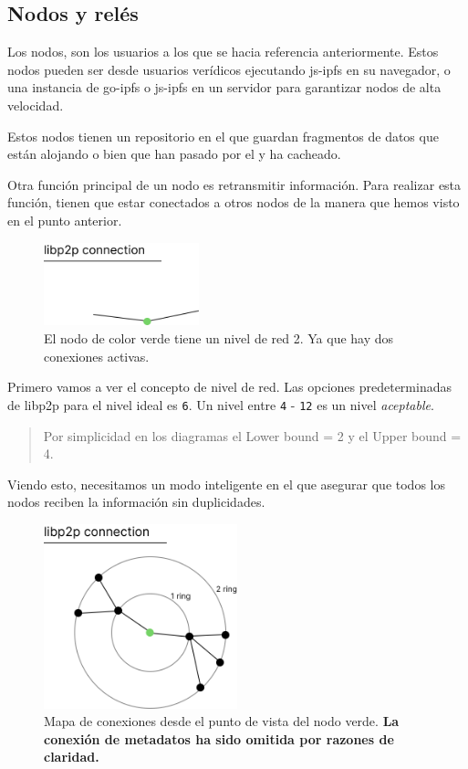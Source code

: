 \subsection{Nodos y relés}
Los nodos, son los usuarios a los que se hacia referencia anteriormente. Estos nodos pueden ser desde usuarios verídicos ejecutando js-ipfs \cite{web:js-ipfs} en su navegador, o una instancia de go-ipfs o js-ipfs \cite{web:js-ipfs} en un servidor para garantizar nodos de alta velocidad.

Estos nodos tienen un repositorio en el que guardan fragmentos de datos que están alojando o bien que han pasado por el y ha cacheado.

Otra función principal de un nodo es retransmitir información. Para realizar esta función, tienen que estar conectados a otros nodos de la manera que hemos visto en el punto anterior.
\begin{figure}[h!]
    \centering
    \includegraphics[width=0.4\textwidth]{Figures/Angulo 2.png}
    \caption{El nodo de color verde tiene un nivel de red 2. Ya que hay dos conexiones activas.}
    \label{fg:network_dgr}
\end{figure}
Primero vamos a ver el concepto de nivel de red. Las opciones predeterminadas de libp2p para el nivel ideal es \verb|6|. Un nivel entre \verb|4| - \verb|12| es un nivel \textit{aceptable}.
\begin{quote}
    Por simplicidad en los diagramas el Lower bound = 2 y el Upper bound = 4.
\end{quote}
Viendo esto, necesitamos un modo inteligente en el que asegurar que todos los nodos reciben la información sin duplicidades.
\begin{figure}[h!]
        \centering
        \includegraphics[width=0.5\textwidth]{Figures/Radios de comunicacion.png}
        \caption{Mapa de conexiones desde el punto de vista del nodo verde. \textbf{La conexión de metadatos ha sido omitida por razones de claridad.}}
        \label{fg:Mapa_de_conexiones}
\end{figure}
